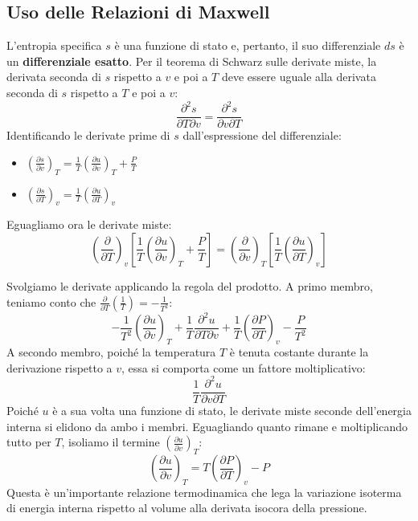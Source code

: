 \subsection{Uso delle Relazioni di Maxwell}
L'entropia specifica $s$ è una funzione di stato e, pertanto, il suo differenziale $ds$ è un \textbf{differenziale esatto}. Per il teorema di Schwarz sulle derivate miste, la derivata seconda di $s$ rispetto a $v$ e poi a $T$ deve essere uguale alla derivata seconda di $s$ rispetto a $T$ e poi a $v$:
\begin{equation}
\frac{\partial^2 s}{\partial T \partial v} = \frac{\partial^2 s}{\partial v \partial T}
\end{equation}
Identificando le derivate prime di $s$ dall'espressione del differenziale:
\begin{itemize}
\item $\left(\frac{\partial s}{\partial v}\right)_T = \frac{1}{T} \left(\frac{\partial u}{\partial v}\right)_T + \frac{P}{T}$
\item $\left(\frac{\partial s}{\partial T}\right)_v = \frac{1}{T} \left(\frac{\partial u}{\partial T}\right)_v$
\end{itemize}
Eguagliamo ora le derivate miste:
\begin{equation}
\left(\frac{\partial}{\partial T}\right)_v \left[ \frac{1}{T} \left(\frac{\partial u}{\partial v}\right)_T + \frac{P}{T} \right] = \left(\frac{\partial}{\partial v}\right)_T \left[ \frac{1}{T} \left(\frac{\partial u}{\partial T}\right)_v \right]
\end{equation}

Svolgiamo le derivate applicando la regola del prodotto.
A primo membro, teniamo conto che $\frac{\partial}{\partial T}\left(\frac{1}{T}\right) = -\frac{1}{T^2}$:
\begin{equation}
-\frac{1}{T^2} \left(\frac{\partial u}{\partial v}\right)_T + \frac{1}{T} \frac{\partial^2 u}{\partial T \partial v} + \frac{1}{T} \left(\frac{\partial P}{\partial T}\right)_v - \frac{P}{T^2}
\end{equation}
A secondo membro, poiché la temperatura $T$ è tenuta costante durante la derivazione rispetto a $v$, essa si comporta come un fattore moltiplicativo:
\begin{equation}
\frac{1}{T} \frac{\partial^2 u}{\partial v \partial T}
\end{equation}
Poiché $u$ è a sua volta una funzione di stato, le derivate miste seconde dell'energia interna si elidono da ambo i membri. Eguagliando quanto rimane e moltiplicando tutto per $T$, isoliamo il termine $\left(\frac{\partial u}{\partial v}\right)_T$:
\begin{equation}
\left(\frac{\partial u}{\partial v}\right)_T = T \left(\frac{\partial P}{\partial T}\right)_v - P
\end{equation}
Questa è un'importante relazione termodinamica che lega la variazione isoterma di energia interna rispetto al volume alla derivata isocora della pressione.


